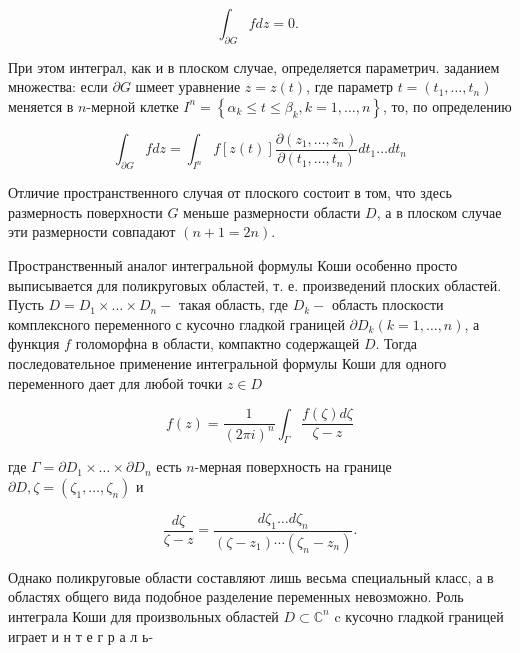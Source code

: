 \documentclass[10pt]{article}
\begin{document}
\[

\int_{\partial G} f d z=0 \text {. }

\]



При этом интеграл, как и в плоском случае, определяется параметрич. заданием множества: если $\partial G$ шмеет уравнение $z=z(t)$, где параметр $t=\left(t_{1}, \ldots, t_{n}\right)$ меняется в $n$-мерной клетке $I^{n}=\left\{\alpha_{k} \leqslant t \leqslant \beta_{k}, k=1, \ldots, n\right\}$, то, по определению



\[

\int_{\partial G} f d z=\int_{I^{n}} f[z(t)] \frac{\partial\left(z_{1}, \ldots, z_{n}\right)}{\partial\left(t_{1}, \ldots, t_{n}\right)} d t_{1} \ldots d t_{n}

\]



Отличие пространственного случая от плоского состоит в том, что здесь размерность поверхности $G$ меньше размерности области $D$, а в плоском случае эти размерности совпадают $(n+1=2 n)$.



Пространственный аналог интегральной формулы Коши особенно просто выписывается для поликруговых областей, т. е. произведений плоских областей. Пусть $D=D_{1} \times \ldots \times D_{n}-$ такая область, где $D_{k}-$ область плоскости комплексного переменного с кусочно гладкой границей $\partial D_{k}(k=1, \ldots, n)$, а функция $f$ голоморфна в области, компактно содержащей $D$. Тогда последовательное применение интегральной формулы Коши для одного переменного дает для любой точки $z \in D$



\[

f(z)=\frac{1}{(2 \pi i)^{n}} \int_{\Gamma} \frac{f(\zeta) d \zeta}{\zeta-z}

\]



где $\Gamma=\partial D_{1} \times \ldots \times \partial D_{n}$ есть $n$-мерная поверхность на границе $\partial D, \zeta=\left(\zeta_{1}, \ldots, \zeta_{n}\right)$ и



\[

\frac{d \zeta}{\zeta-z}=\frac{d \zeta_{1} \ldots d \zeta_{n}}{\left(\zeta-z_{1}\right) \cdots\left(\zeta_{n}-z_{n}\right)} .

\]



Однако поликруговые области составляют лишь весьма специальный класс, а в областях общего вида подобное разделение переменных невозможно. Роль интеграла Коши для произвольных областей $D \subset \mathbb{C}^{n}$ c кусочно гладкой границей играет и н т е г р а л ь-
\end{document}
